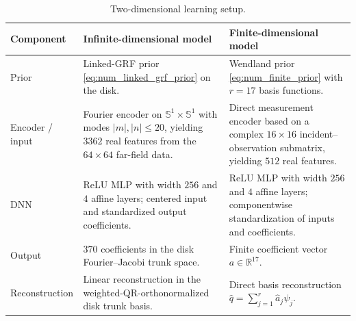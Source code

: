 \documentclass{article}
\numberwithin{equation}{section}
\theoremstyle{plain}
\newcommand{\RR}{\mathbb{R}}
\newcommand{\SSS}{\mathbb{S}}
\begin{document}
\begin{table}[H]
\centering
\caption{Two-dimensional learning setup.}
\label{tab:pipeline_2d}
\begin{tabular}{@{}p{}p{}p{}@{}}
\toprule
Component & Infinite-dimensional model & Finite-dimensional model \\
\midrule
Prior
& Linked-GRF prior \eqref{eq:num_linked_grf_prior} on the disk.
& Wendland prior \eqref{eq:num_finite_prior} with $r=17$ basis functions. \\
\addlinespace
Encoder / input
& Fourier encoder on $\SSS^1\times\SSS^1$ with modes $|m|,|n|\le20$, yielding $3362$ real features from the $64\times64$ far-field data.
& Direct measurement encoder based on a complex $16\times16$ incident--observation submatrix, yielding $512$ real features. \\
\addlinespace
DNN
& ReLU MLP with width $256$ and $4$ affine layers; centered input and standardized output coefficients.
& ReLU MLP with width $256$ and $4$ affine layers; componentwise standardization of inputs and coefficients. \\
\addlinespace
Output
& $370$ coefficients in the disk Fourier--Jacobi trunk space.
& Finite coefficient vector $a\in\RR^{17}$. \\
\addlinespace
Reconstruction
& Linear reconstruction in the weighted-QR-orthonormalized disk trunk basis.
& Direct basis reconstruction $\widehat q=\sum_{j=1}^r\widehat a_j\psi_j$. \\
\bottomrule
\end{tabular}
\end{table}
\end{document}
